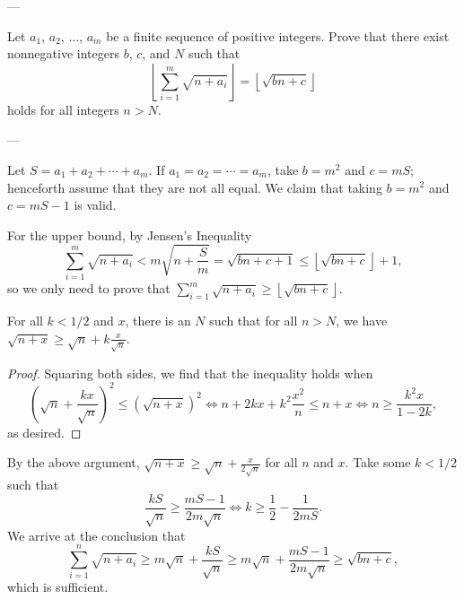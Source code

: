 
---

Let $a_1$, $a_2$, $\ldots$, $a_m$ be a finite sequence of positive integers. Prove that there exist nonnegative integers $b$, $c$, and $N$ such that \[\left\lfloor\sum_{i=1}^m\sqrt{n+a_i}\right\rfloor=\left\lfloor\sqrt{bn+c}\right\rfloor\]
holds for all integers $n>N$.

---

Let $S=a_1+a_2+\cdots+a_m$. If $a_1=a_2=\cdots=a_m$, take $b=m^2$ and $c=mS$; henceforth assume that they are not all equal. We claim that taking $b=m^2$ and $c=mS-1$ is valid.

For the upper bound, by Jensen's Inequality \[\sum_{i=1}^m\sqrt{n+a_i}<m\sqrt{n+\frac Sm}=\sqrt{bn+c+1}\le\left\lfloor\sqrt{bn+c}\right\rfloor+1,\]
so we only need to prove that $\sum_{i=1}^m\sqrt{n+a_i}\ge\left\lfloor\sqrt{bn+c}\right\rfloor$.
\begin{iclaim*}
    For all $k<1/2$ and $x$, there is an $N$ such that for all $n>N$, we have $\sqrt{n+x}\ge\sqrt n+k\frac x{\sqrt n}$.
\end{iclaim*}
\begin{proof}
Squaring both sides, we find that the inequality holds when\[\left(\sqrt n+\frac{kx}{\sqrt n}\right)^2\le\left(\sqrt{n+x}\right)^2\iff n+2kx+k^2\frac{x^2}n\le n+x\iff n\ge\frac{k^2x}{1-2k},\]
    as desired.
\end{proof}

By the above argument, $\sqrt{n+x}\ge\sqrt n+\frac x{2\sqrt n}$ for all $n$ and $x$. Take some $k<1/2$ such that \[\frac{kS}{\sqrt n}\ge\frac{mS-1}{2m\sqrt n}\iff k\ge\frac12-\frac1{2mS}.\]
We arrive at the conclusion that \[\sum_{i=1}^n\sqrt{n+a_i}\ge m\sqrt n+\frac{kS}{\sqrt n}\ge m\sqrt n+\frac{mS-1}{2m\sqrt n}\ge\sqrt{bn+c},\]
which is sufficient.


